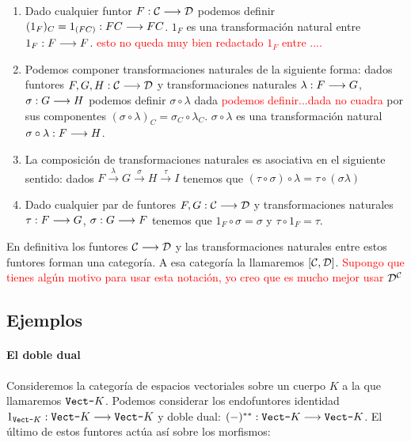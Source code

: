 \begin{proposition}
  \begin{enumerate}
  \item Dado cualquier funtor $F : \mathcal{C}\longrightarrow \mathcal{D}$ podemos definir
    $({1_F})_C  = 1_{(FC)} : FC\longrightarrow FC$. $1_F$ es una transformación
    natural entre $1_F : F\longrightarrow F$. \textcolor{red}{esto no queda  muy bien redactado $1_F$ entre .... }
  \item Podemos componer transformaciones naturales de la siguiente
    forma: dados funtores $F, G, H : \mathcal{C}\longrightarrow \mathcal{D}$ y transformaciones
    naturales $\lambda : F\longrightarrow G$, $\sigma : G\longrightarrow H$ podemos
    definir $\sigma \circ \lambda$ dada \textcolor{red}{podemos definir...dada no cuadra}
    por sus componentes
    $(\sigma\circ\lambda)_C = \sigma_C \circ \lambda_C$.
    $\sigma\circ\lambda$ es una transformación natural
    $\sigma\circ\lambda : F\longrightarrow H$.
  \item La composición de transformaciones naturales
    es asociativa en el siguiente sentido: dados
    $F \xrightarrow{\lambda} G \xrightarrow{\sigma} H \xrightarrow{\tau}I$
    tenemos que $(\tau \circ \sigma) \circ \lambda = \tau \circ (\sigma \lambda)$
  \item Dado cualquier par de funtores $F,G : \mathcal{C}\longrightarrow \mathcal{D}$ y
    transformaciones naturales $\tau : F\longrightarrow G$,
    $\sigma : G\longrightarrow F$ tenemos que $1_F \circ \sigma = \sigma$
    y $\tau \circ 1_F = \tau$.
  \end{enumerate}

  En definitiva los funtores $\mathcal{C}\longrightarrow \mathcal{D}$ y las transformaciones
  naturales entre estos funtores forman una categoría. A esa categoría
  la llamaremos $[\mathcal{C}, \mathcal{D}]$. \textcolor{red}{Supongo que tienes algún motivo para usar esta notación, yo creo que es mucho mejor usar $\mathcal{D}^{\mathcal{C}}$}
\end{proposition}

\subsection{Ejemplos}
\paragraph{El doble dual}
Consideremos la categoría de espacios vectoriales sobre un cuerpo
$K$ a la que llamaremos $\texttt{Vect-}K$. Podemos considerar los endofuntores
identidad $1_{\texttt{Vect-}K} : \texttt{Vect-}K\longrightarrow \texttt{Vect-}K$ y  doble dual:
$(-)^{**} : \texttt{Vect-}K\longrightarrow \texttt{Vect-}K$. El último de estos funtores actúa
así sobre los morfismos:

